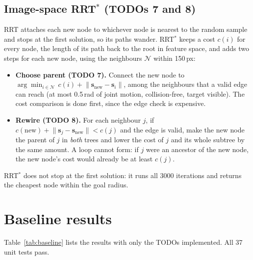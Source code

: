 \documentclass[11pt,a4paper]{article}
\newcommand{\vect}[1]{\bm{#1}}
\begin{document}
\subsection{Image-space RRT$^{*}$ (TODOs 7 and 8)}

RRT attaches each new node to whichever node is nearest to the random sample and stops at the first
solution, so its paths wander. RRT$^{*}$ \cite{karaman2011} keeps a cost $c(i)$ for every node, the
length of its path back to the root in feature space, and adds two steps for each new node, using the
neighbours $\mathcal N$ within 150\,px:
\begin{itemize}
  \item \textbf{Choose parent (TODO 7).} Connect the new node to
        $\arg\min_{i\in\mathcal N}\, c(i)+\lVert\vect s_{\text{new}}-\vect s_i\rVert$, among the
        neighbours that a valid edge can reach (at most 0.5\,rad of joint motion, collision-free,
        target visible). The cost comparison is done first, since the edge check is expensive.
  \item \textbf{Rewire (TODO 8).} For each neighbour $j$, if
        $c(\text{new})+\lVert\vect s_j-\vect s_{\text{new}}\rVert<c(j)$ and the edge is valid, make the
        new node the parent of $j$ in \emph{both} trees and lower the cost of $j$ and its whole subtree by
        the same amount. A loop cannot form: if $j$ were an ancestor of the new node, the new node's cost
        would already be at least $c(j)$.
\end{itemize}
RRT$^{*}$ does not stop at the first solution: it runs all 3000 iterations and returns the cheapest node
within the goal radius.

\section{Baseline results}\label{sec:baseline}

Table~\ref{tab:baseline} lists the results with only the TODOs implemented. All 37 unit tests pass.
\end{document}
